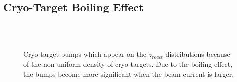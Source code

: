 \subsection{Cryo-Target Boiling Effect}
\begin{figure}[!ht]
  \begin{center}
    \\
    \\
    \caption[Cryo-target bumps]{\footnotesize{Cryo-target bumps which appear on the $z_{react}$ distributions because of the non-uniform density of cryo-targets. Due to the boiling effect, the bumps become more significant when the beam current is larger.}}
    \label{bump_current}
  \end{center}
\end{figure}
